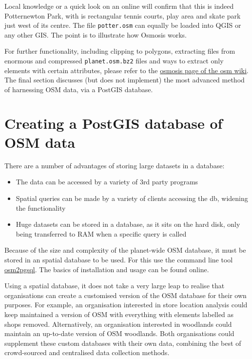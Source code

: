 \documentclass[]{article}
\begin{document}
Local knowledge or a quick look on an online will confirm that this is
indeed Potternewton Park, with is rectangular tennis courts, play area
and skate park just west of its centre. The file \texttt{potter.osm} can
equally be loaded into QGIS or any other GIS. The point is to illustrate
how Osmosis works.

For further functionality, including clipping to polygons, extracting
files from enormous and compressed \texttt{planet.osm.bz2} files and
ways to extract only elements with certain attributes, please refer to
the \href{http://wiki.openstreetmap.org/wiki/Osmosis}{osmosis page of
the osm wiki}. The final section discusses (but does not implement) the
most advanced method of harnessing OSM data, via a PostGIS database.

\section{Creating a PostGIS database of OSM
data}\label{creating-a-postgis-database-of-osm-data}

There are a number of advantages of storing large datasets in a
database:

\begin{itemize}
\itemsep1pt\parskip0pt
\item
  The data can be accessed by a variety of 3rd party programs
\item
  Spatial queries can be made by a variety of clients accessing the db,
  widening the functionality
\item
  Huge datasets can be stored in a database, as it sits on the hard
  disk, only being transferred to RAM when a specific query is called
\end{itemize}

Because of the size and complexity of the planet-wide OSM database, it
must be stored in an spatial database to be used. For this use the
command line tool
\href{http://wiki.openstreetmap.org/wiki/Osm2pgsql}{osm2pgsql}. The
basics of installation and usage can be found online.

Using a spatial database, it does not take a very large leap to realise
that organisations can create a customised version of the OSM database
for their own purposes. For example, an organisation interested in store
location analysis could keep maintained a version of OSM with everything
with elements labelled as shops removed. Alternatively, an organisation
interested in woodlands could maintain an up-to-date version of OSM
woodlands. Both organisations could supplement these custom databases
with their own data, combining the best of crowd-sourced and centralised
data collection methods.
\end{document}
